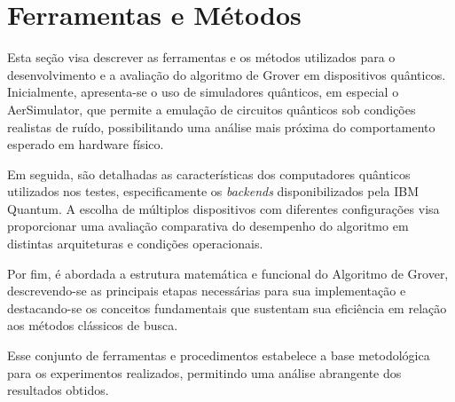 \chapter{Ferramentas e Métodos}
\label{chap: ferramentas}

Esta seção visa descrever as ferramentas e os métodos utilizados para o desenvolvimento e a avaliação do algoritmo de Grover em dispositivos qu\^{a}nticos. Inicialmente, apresenta-se o uso de simuladores qu\^{a}nticos, em especial o AerSimulator, que permite a emulação de circuitos qu\^{a}nticos sob condições realistas de ruído, possibilitando uma análise mais próxima do comportamento esperado em hardware físico.

Em seguida, são detalhadas as características dos computadores qu\^{a}nticos utilizados nos testes, especificamente os \textit{backends} disponibilizados pela IBM Quantum. A escolha de múltiplos dispositivos com diferentes configurações visa proporcionar uma avaliação comparativa do desempenho do algoritmo em distintas arquiteturas e condições operacionais.

Por fim, é abordada a estrutura matemática e funcional do Algoritmo de Grover, descrevendo-se as principais etapas necessárias para sua implementação e destacando-se os conceitos fundamentais que sustentam sua eficiência em relação aos métodos clássicos de busca.

Esse conjunto de ferramentas e procedimentos estabelece a base metodológica para os experimentos realizados, permitindo uma análise abrangente dos resultados obtidos.
%



